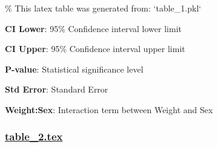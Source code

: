 \documentclass[11pt]{article}
\begin{document}
\begin{codeoutput}
\% This latex table was generated from: `table\_1.pkl`
\begin{table}[h]
\caption{Linear regression model with interaction between weight and sex predicting OTTD.}
\label{table:linear\_regression\_model}
\begin{threeparttable}
\renewcommand{\TPTminimum}{\linewidth}
\begin{tablenotes}
\footnotesize
\item \textbf{CI Lower}: 95\% Confidence interval lower limit
\item \textbf{CI Upper}: 95\% Confidence interval upper limit
\item \textbf{P-value}: Statistical significance level
\item \textbf{Std Error}: Standard Error
\item \textbf{Weight:Sex}: Interaction term between Weight and Sex
\end{tablenotes}
\end{threeparttable}
\end{table}
\end{codeoutput}

\subsubsection*{\hyperlink{code-LaTeX Table Design-table-2-tex}{table\_2.tex}}
\end{document}
